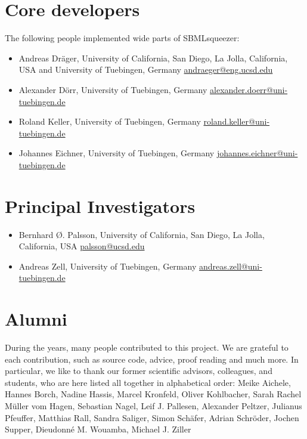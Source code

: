 \section{Core developers}

The following people implemented wide parts of SBMLsqueezer:
\begin{itemize}
\item Andreas Dr\"ager, 
  University of California, San Diego, La Jolla, California, USA and
  University of Tuebingen, Germany
  \href{mailto:andraeger@eng.ucsd.edu}{andraeger@eng.ucsd.edu}
\item Alexander D\"orr, 
  University of Tuebingen, Germany
  \href{mailto:alexander.doerr@uni-tuebingen.de}{alexander.doerr@uni-tuebingen.de}
\item Roland Keller,
  University of Tuebingen, Germany
  \href{mailto:roland.keller@uni-tuebingen.de}{roland.keller@uni-tuebingen.de}
\item Johannes Eichner,
  University of Tuebingen, Germany
  \href{mailto:johannes.eichner@uni-tuebingen.de}{johannes.eichner@uni-tuebingen.de}
\end{itemize}

\section{Principal Investigators}

\begin{itemize}
\item Bernhard \O. Palsson,
  University of California, San Diego, La Jolla, California, USA
  \href{mailto:palsson@ucsd.edu}{palsson@ucsd.edu}
\item Andreas Zell, 
  University of Tuebingen, Germany
  \href{mailto:andreas.zell@uni-tuebingen.de}{andreas.zell@uni-tuebingen.de}
\end{itemize}

\section{Alumni}

During the years, many people contributed to this project.
We are grateful to each contribution, such as source code, advice, proof reading
and much more. In particular, we like to thank our former scientific advisors,
colleagues, and students, who are here listed all together in alphabetical
order:
Meike Aichele,
Hannes Borch,
Nadine Hassis,
Marcel Kronfeld,
Oliver Kohlbacher,
Sarah Rachel M\"uller vom Hagen,
Sebastian Nagel,
Leif J. Pallesen,
Alexander Peltzer,
Julianus Pfeuffer,
Matthias Rall,
Sandra Saliger,
Simon Sch\"afer,
Adrian Schr\"oder,
Jochen Supper,
Dieudonn\'e M. Wouamba,
Michael J. Ziller
